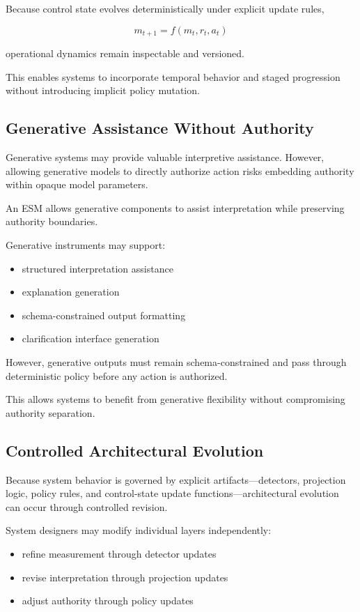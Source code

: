 \documentclass[11pt]{article}
\begin{document}
Because control state evolves deterministically under explicit update rules,

\[
m_{t+1} = f(m_t, r_t, a_t)
\]

operational dynamics remain inspectable and versioned.

This enables systems to incorporate temporal behavior and staged progression without introducing implicit policy mutation.

\subsection{Generative Assistance Without Authority}

Generative systems may provide valuable interpretive assistance. However, allowing generative models to directly authorize action risks embedding authority within opaque model parameters.

An ESM allows generative components to assist interpretation while preserving authority boundaries.

Generative instruments may support:

\begin{itemize}
  \item structured interpretation assistance
  \item explanation generation
  \item schema-constrained output formatting
  \item clarification interface generation
\end{itemize}

However, generative outputs must remain schema-constrained and pass through deterministic policy before any action is authorized.

This allows systems to benefit from generative flexibility without compromising authority separation.

\subsection{Controlled Architectural Evolution}

Because system behavior is governed by explicit artifacts—detectors, projection logic, policy rules, and control-state update functions—architectural evolution can occur through controlled revision.

System designers may modify individual layers independently:

\begin{itemize}
  \item refine measurement through detector updates
  \item revise interpretation through projection updates
  \item adjust authority through policy updates
\end{itemize}
\end{document}
